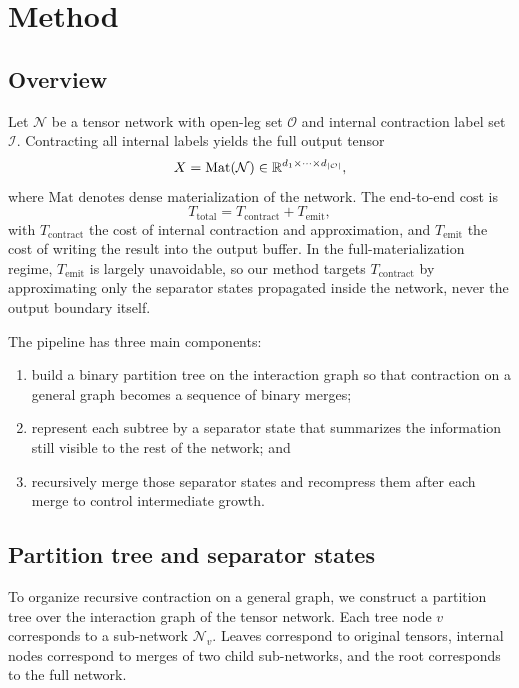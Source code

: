 \section{Method}

\subsection{Overview}

Let $\mathcal N$ be a tensor network with open-leg set $\mathcal O$ and internal contraction label set $\mathcal I$. Contracting all internal labels yields the full output tensor
\[
X = \mathrm{Mat}(\mathcal N) \in \mathbb{R}^{d_1 \times \cdots \times d_{|\mathcal O|}},
\]
where $\mathrm{Mat}$ denotes dense materialization of the network. The end-to-end cost is
\[
T_{\mathrm{total}} = T_{\mathrm{contract}} + T_{\mathrm{emit}},
\]
with $T_{\mathrm{contract}}$ the cost of internal contraction and approximation, and $T_{\mathrm{emit}}$ the cost of writing the result into the output buffer. In the full-materialization regime, $T_{\mathrm{emit}}$ is largely unavoidable, so our method targets $T_{\mathrm{contract}}$ by approximating only the separator states propagated inside the network, never the output boundary itself.

The pipeline has three main components:
\begin{enumerate}
    \item build a binary partition tree on the interaction graph so that contraction on a general graph becomes a sequence of binary merges;
    \item represent each subtree by a separator state that summarizes the information still visible to the rest of the network; and
    \item recursively merge those separator states and recompress them after each merge to control intermediate growth.
\end{enumerate}

\subsection{Partition tree and separator states}

To organize recursive contraction on a general graph, we construct a partition tree over the interaction graph of the tensor network. Each tree node $v$ corresponds to a sub-network $\mathcal N_v$. Leaves correspond to original tensors, internal nodes correspond to merges of two child sub-networks, and the root corresponds to the full network.

